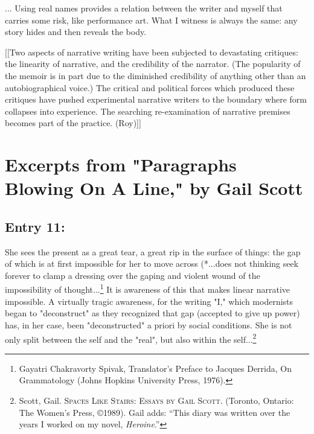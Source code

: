 \documentclass[
]{memoir}
\begin{document}
... Using real names provides a relation between the writer and myself
that carries some risk, like performance art. What I witness is always
the same: any story hides and then reveals the body.

{[}{[}Two aspects of narrative writing have been subjected to
devastating critiques: the linearity of narrative, and the credibility
of the narrator. (The popularity of the memoir is in part due to the
diminished credibility of anything other than an autobiographical
voice.) The critical and political forces which produced these critiques
have pushed experimental narrative writers to the boundary where form
collapses into experience. The searching re-examination of narrative
premises becomes part of the practice. (Roy){]}{]}

\hypertarget{excerpts-from-paragraphs-blowing-on-a-line-by-gail-scott}{%
\section*{Excerpts from "Paragraphs Blowing On A Line," by Gail
Scott}\label{excerpts-from-paragraphs-blowing-on-a-line-by-gail-scott}}

\hypertarget{entry-11}{%
\subsection*{Entry 11:}\label{entry-11}}

She sees the present as a great tear, a great rip in the surface of
things: the gap of which is at first impossible for her to move across
(*...does not thinking seek forever to clamp a dressing over the gaping
and violent wound of the impossibility of thought...\footnote{Gayatri
  Chakravorty Spivak, Translator's Preface to Jacques Derrida, On
  Grammatology (Johns Hopkins University Press, 1976).} It is awareness
of this that makes linear narrative impossible. A virtually tragic
awareness, for the writing "I," which modernists began to "deconstruct"
as they recognized that gap (accepted to give up power) has, in her
case, been "deconstructed" a priori by social conditions. She is not
only split between the self and the "real", but also within the
self...\footnote{Scott, Gail. \textsc{Spaces Like Stairs: Essays by Gail
  Scott}. (Toronto, Ontario: The Women's Press, ©1989). Gail adds:
  ``This diary was written over the years I worked on my novel,
  \emph{Heroine}.''}
\end{document}
